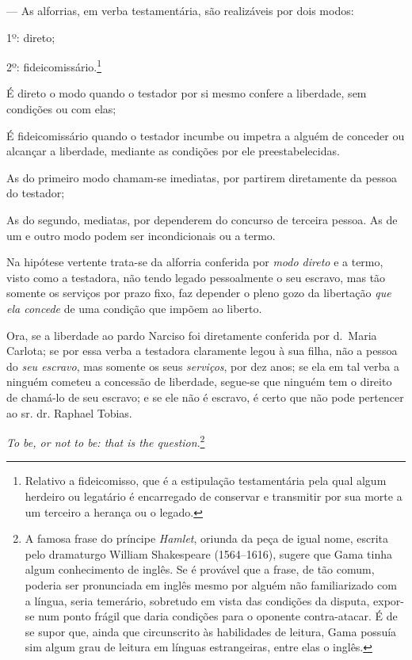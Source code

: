 {--- As alforrias, em verba testamentária, são realizáveis por dois
modos:

1º: direto;

2º: fideicomissário\textsuperscript{⁠}.\footnote{ Relativo a
  fideicomisso, que é a estipulação testamentária pela qual algum
  herdeiro ou legatário é encarregado de conservar e transmitir por sua
  morte a um terceiro a herança ou o legado.}

É direto o modo quando o testador por si mesmo confere a liberdade, sem
condições ou com elas;

É fideicomissário quando o testador incumbe ou impetra a alguém de
conceder ou alcançar a liberdade, mediante as condições por ele
preestabelecidas.

As do primeiro modo chamam-se imediatas, por partirem diretamente da
pessoa do testador;

As do segundo, mediatas, por dependerem do concurso de terceira pessoa.
As de um e outro modo podem ser incondicionais ou a termo.

Na hipótese vertente trata-se da alforria conferida por \emph{modo
direto} e a termo, visto como a testadora, não tendo legado pessoalmente
o seu escravo, mas tão somente os serviços por prazo fixo, faz depender
o pleno gozo da libertação \emph{que ela concede} de uma condição que
impõem ao liberto.

Ora, se a liberdade ao pardo Narciso foi diretamente conferida por
d.~Maria Carlota; se por essa verba a testadora claramente legou à sua
filha, não a pessoa do \emph{seu escravo}, mas somente os seus
\emph{serviços}, por dez anos; se ela em tal verba a ninguém cometeu a
concessão de liberdade, segue-se que ninguém tem o direito de chamá-lo
de seu escravo; e se ele não é escravo, é certo que não pode pertencer
ao sr. dr. Raphael Tobias.

\emph{To be, or not to be: that is the question}.\footnote{ A famosa
  frase do príncipe \emph{Hamlet}, oriunda da peça de igual nome,
  escrita pelo dramaturgo William Shakespeare (1564--1616), sugere que
  Gama tinha algum conhecimento de inglês. Se é provável que a frase, de
  tão comum, poderia ser pronunciada em inglês mesmo por alguém não
  familiarizado com a língua, seria temerário, sobretudo em vista das
  condições da disputa, expor-se num ponto frágil que daria condições
  para o oponente contra-atacar. É de se supor que, ainda que
  circunscrito às habilidades de leitura, Gama possuía sim algum grau de
  leitura em línguas estrangeiras, entre elas o inglês.}

}
